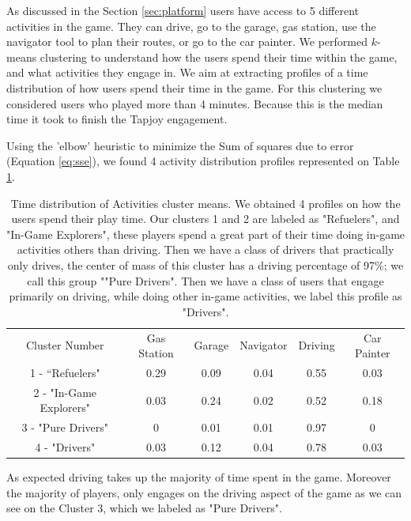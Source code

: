 \documentclass[preprint,authoryear,12pt]{elsarticle}
\begin{document}
As discussed in the Section \ref{sec:platform} users have access to 5 different activities in the game. They can drive, go to the garage, gas station, use the navigator tool to plan their routes, or go to the car painter.
We performed $k$-means clustering to understand how the users spend their time within the game, and what activities they engage in. We aim at extracting profiles of a time distribution of how users spend their time in the game.
For this clustering we considered users who played more than 4 minutes. Because this is the median time it took to finish the Tapjoy engagement.


Using the 'elbow' heuristic to minimize the Sum of squares due to error (Equation \ref{eq:sse}), we found 4 activity distribution profiles represented on Table \ref{T:cluster_activities}.

\begin{table}[!h]
	\renewcommand*{\arraystretch}{1.2}
	\caption{Time distribution of Activities cluster means. We obtained 4 profiles on how the users spend their play time. Our clusters 1 and 2 are labeled as "Refuelers", and "In-Game Explorers", these players spend a great part of their time doing in-game activities others than driving. Then we have a class of drivers that practically only drives, the center of mass of this cluster has a driving percentage of 97\%; we call this group ""Pure Drivers". Then we have a class of users that engage primarily on driving, while doing other in-game activities, we label this profile as "Drivers".   }
	\begin{center}
		\begin{tabular}{c|c|c|c|c|c}
			Cluster Number	& Gas Station &	Garage &	Navigator &	Driving &	Car Painter 	\\
			1 - ``Refuelers" &	0.29 &	0.09 &	0.04 &	0.55 &	0.03\\
			2 - "In-Game Explorers" &	0.03 &	0.24 &	0.02 &	0.52 &	0.18 \\
			3 - "Pure Drivers" &	0 &	0.01 &	0.01 &	0.97 &	0  \\
			4 - "Drivers" &	0.03 &	0.12 &	0.04 &	0.78 &	0.03   \\
		\end{tabular}
	\end{center}
	\label{T:cluster_activities}
\end{table}


As expected driving takes up the majority of time spent in the game. Moreover the majority of players, only engages on the driving aspect of the game as we can see on the Cluster 3, which we labeled as "Pure Drivers".
\end{document}
